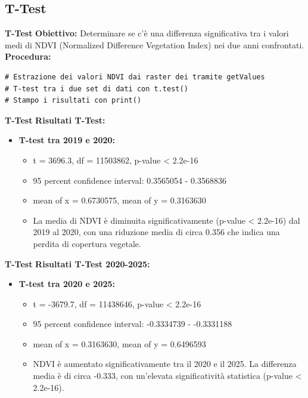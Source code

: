 \documentclass{beamer}
\begin{document}
\subsection{T-Test}
\begin{frame}[fragile]{\textbf{T-Test}}
\textbf{Obiettivo:} Determinare se c'è una differenza significativa tra i valori medi di NDVI (Normalized Difference Vegetation Index) nei due anni confrontati.
\newline
\newline
\textbf{Procedura:}
\begin{lstlisting}
# Estrazione dei valori NDVI dai raster dei tramite getValues
# T-test tra i due set di dati con t.test()
# Stampo i risultati con print()
\end{lstlisting}
\end{frame}

\begin{frame}[fragile]{\textbf{T-Test}}
\textbf{Risultati T-Test:}
\begin{itemize}
    \item \textbf{T-test tra 2019 e 2020:}
    \begin{itemize}
        \item t = 3696.3, df = 11503862, p-value < 2.2e-16
        \item 95 percent confidence interval: 0.3565054 - 0.3568836
        \item mean of x = 0.6730575, mean of y = 0.3163630
        \newline
        \item La media di NDVI è diminuita significativamente (p-value < 2.2e-16) dal 2019 al 2020, con una riduzione media di circa 0.356 che indica una perdita di copertura vegetale.
    \end{itemize}
\end{itemize}
\end{frame}

\begin{frame}[fragile]{\textbf{T-Test}}
\textbf{Risultati T-Test 2020-2025:}
\begin{itemize}
     \item \textbf{T-test tra 2020 e 2025:}
    \begin{itemize}
        \item t = -3679.7, df = 11438646, p-value < 2.2e-16
        \item 95 percent confidence interval: -0.3334739 - -0.3331188
        \item mean of x = 0.3163630, mean of y = 0.6496593
        \newline
        \item NDVI è aumentato significativamente tra il 2020 e il 2025. La differenza media è di circa -0.333, con un'elevata significatività statistica (p-value < 2.2e-16).
    \end{itemize}
\end{itemize}
\end{frame}
\end{document}
